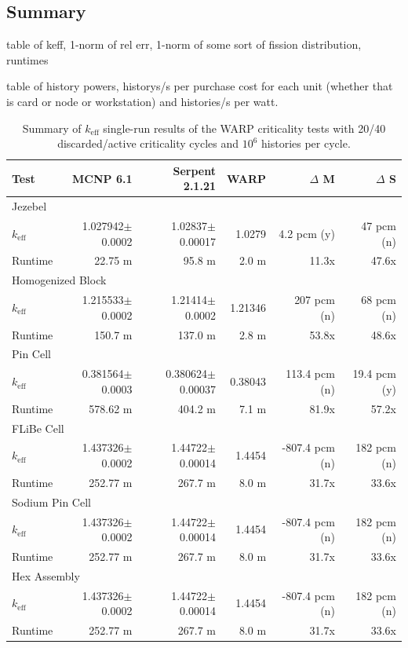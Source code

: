\documentclass[preprint,12pt]{elsarticle}
\begin{document}
\subsection{Summary}

table of keff, 1-norm of rel err, 1-norm of some sort of fission distribution, runtimes

table of history powers, historys/s per purchase cost for each unit (whether that is card or node or workstation) and histories/s per watt. 

\begin{table}[h]
\centering
\caption{Summary of $k_\mathrm{eff}$ single-run results of the WARP criticality tests with 20/40 discarded/active criticality cycles and $10^6$ histories per cycle.}
\label{test_summary_6}
\small
\begin{tabular}{| l | r | r | r | r | r |}
\hline
Test & MCNP 6.1 & Serpent 2.1.21 & WARP & $\Delta$ M & $\Delta$ S \\
\hline
\hline
\multicolumn{6}{|l|}{Jezebel} \\
\hline
$k_\mathrm{eff}$ & 1.027942$\pm$0.0002 & 1.02837$\pm$0.00017 & 1.0279 & 4.2 pcm (y) & 47 pcm (n) \\
\hline
Runtime & 22.75 m & 95.8 m & 2.0 m & 11.3x & 47.6x \\
\hline
\hline
\multicolumn{6}{|l|}{Homogenized Block }\\
\hline
$k_\mathrm{eff}$ & 1.215533$\pm$0.0002 & 1.21414$\pm$0.0002 & 1.21346 & 207 pcm (n) & 68 pcm (n) \\
\hline
Runtime & 150.7 m & 137.0 m & 2.8 m & 53.8x & 48.6x \\
\hline
\hline
\multicolumn{6}{|l|}{Pin Cell}\\
\hline
$k_\mathrm{eff}$ & 0.381564$\pm$0.0003 & 0.380624$\pm$0.00037 & 0.38043 & 113.4 pcm (n) & 19.4 pcm (y) \\
\hline
Runtime & 578.62 m & 404.2 m & 7.1 m & 81.9x & 57.2x \\
\hline
\hline
\multicolumn{6}{|l|}{FLiBe Cell}\\
\hline
$k_\mathrm{eff}$ & 1.437326$\pm$0.0002 & 1.44722$\pm$0.00014 & 1.4454 & -807.4 pcm (n) & 182 pcm (n) \\
\hline
Runtime & 252.77 m & 267.7 m & 8.0 m & 31.7x & 33.6x \\
\hline
\hline
\multicolumn{6}{|l|}{Sodium Pin Cell}\\
\hline
$k_\mathrm{eff}$ & 1.437326$\pm$0.0002 & 1.44722$\pm$0.00014 & 1.4454 & -807.4 pcm (n) & 182 pcm (n) \\
\hline
Runtime & 252.77 m & 267.7 m & 8.0 m & 31.7x & 33.6x \\
\hline
\hline
\multicolumn{6}{|l|}{Hex Assembly}\\
\hline
$k_\mathrm{eff}$ & 1.437326$\pm$0.0002 & 1.44722$\pm$0.00014 & 1.4454 & -807.4 pcm (n) & 182 pcm (n) \\
\hline
Runtime & 252.77 m & 267.7 m & 8.0 m & 31.7x & 33.6x \\
\hline
\end{tabular}
\end{table}
\end{document}
